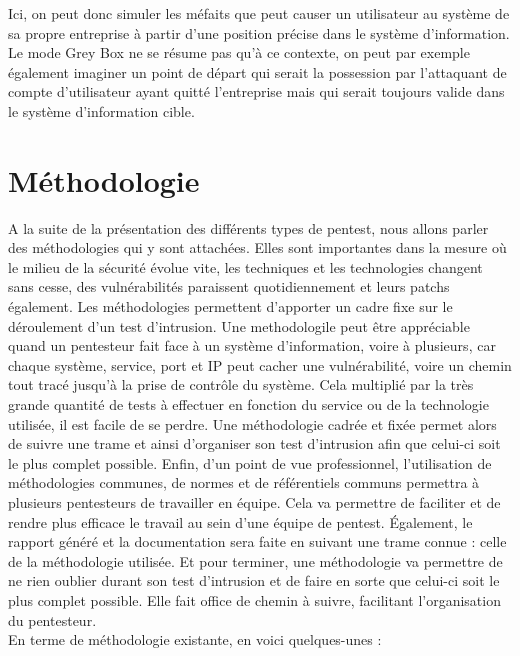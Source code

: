 \documentclass[a4paper]{memoir}
\begin{document}
Ici, on peut donc simuler les méfaits que peut causer un utilisateur au système de sa propre entreprise à partir d’une position précise dans le système d’information. Le mode Grey Box ne se résume pas qu’à ce contexte, on peut par exemple également imaginer un point de départ qui serait la possession par l’attaquant de compte d’utilisateur ayant quitté l’entreprise mais qui serait toujours valide dans le système d’information cible.


\section{Méthodologie}

A la suite de la présentation des différents types de pentest, nous allons parler des méthodologies qui y sont attachées.
Elles sont importantes dans la mesure où le milieu de la sécurité évolue vite, les techniques et les technologies changent sans cesse, des vulnérabilités paraissent quotidiennement et leurs patchs également. Les méthodologies permettent d’apporter un cadre fixe sur le déroulement d’un test d’intrusion.
Une methodologile peut être appréciable quand un pentesteur fait face à un système d’information, voire à plusieurs, car chaque système, service, port et IP peut cacher une vulnérabilité, voire un chemin tout tracé jusqu’à la prise de contrôle du système. Cela multiplié par la très grande quantité de tests à effectuer en fonction du service ou de la technologie utilisée, il est facile de se perdre. Une méthodologie cadrée et fixée permet alors de suivre une trame et ainsi d’organiser son test d’intrusion afin que celui-ci soit le plus complet possible.
Enfin, d'un point de vue professionnel, l'utilisation de méthodologies communes, de normes et de référentiels communs permettra à plusieurs pentesteurs de travailler en équipe. Cela va permettre de faciliter et de rendre plus efficace le travail au sein d’une équipe de pentest. Également, le rapport généré et la documentation sera faite en suivant une trame connue : celle de la méthodologie utilisée.
Et pour terminer, une méthodologie va permettre de ne rien oublier durant son test d’intrusion et de faire en sorte que celui-ci soit le plus complet possible. Elle fait office de chemin à suivre, facilitant l’organisation du pentesteur.\\

En terme de méthodologie existante, en voici quelques-unes :\\
\end{document}
